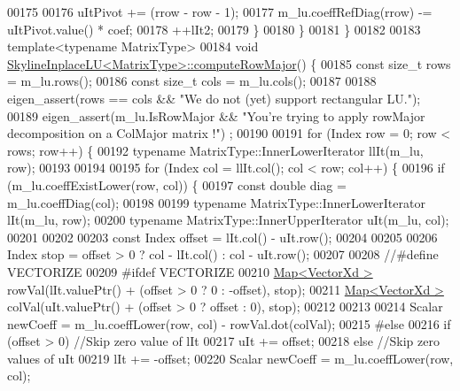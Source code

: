 \begin{DoxyCode}
00175 
00176             uItPivot += (rrow - row - 1);
00177             m\_lu.coeffRefDiag(rrow) -= uItPivot.value() * coef;
00178             ++lIt2;
00179         \}
00180     \}
00181 \}
00182 
00183 \textcolor{keyword}{template}<\textcolor{keyword}{typename} MatrixType>
00184 \textcolor{keywordtype}{void} \hyperlink{class_eigen_1_1_skyline_inplace_l_u}{SkylineInplaceLU<MatrixType>::computeRowMajor}() \{
00185     \textcolor{keyword}{const} \textcolor{keywordtype}{size\_t} rows = m\_lu.rows();
00186     \textcolor{keyword}{const} \textcolor{keywordtype}{size\_t} cols = m\_lu.cols();
00187 
00188     eigen\_assert(rows == cols && \textcolor{stringliteral}{"We do not (yet) support rectangular LU."});
00189     eigen\_assert(m\_lu.IsRowMajor && \textcolor{stringliteral}{"You're trying to apply rowMajor decomposition on a ColMajor matrix !"})
      ;
00190 
00191     \textcolor{keywordflow}{for} (Index row = 0; row < rows; row++) \{
00192         \textcolor{keyword}{typename} MatrixType::InnerLowerIterator llIt(m\_lu, row);
00193 
00194 
00195         \textcolor{keywordflow}{for} (Index col = llIt.col(); col < row; col++) \{
00196             \textcolor{keywordflow}{if} (m\_lu.coeffExistLower(row, col)) \{
00197                 \textcolor{keyword}{const} \textcolor{keywordtype}{double} diag = m\_lu.coeffDiag(col);
00198 
00199                 \textcolor{keyword}{typename} MatrixType::InnerLowerIterator lIt(m\_lu, row);
00200                 \textcolor{keyword}{typename} MatrixType::InnerUpperIterator uIt(m\_lu, col);
00201 
00202 
00203                 \textcolor{keyword}{const} Index offset = lIt.col() - uIt.row();
00204 
00205 
00206                 Index stop = offset > 0 ? col - lIt.col() : col - uIt.row();
00207 
00208                 \textcolor{comment}{//#define VECTORIZE}
00209 \textcolor{preprocessor}{#ifdef VECTORIZE}
00210                 \hyperlink{group___core___module_class_eigen_1_1_map}{Map<VectorXd >} rowVal(lIt.valuePtr() + (offset > 0 ? 0 : -offset), stop);
00211                 \hyperlink{group___core___module_class_eigen_1_1_map}{Map<VectorXd >} colVal(uIt.valuePtr() + (offset > 0 ? offset : 0), stop);
00212 
00213 
00214                 Scalar newCoeff = m\_lu.coeffLower(row, col) - rowVal.dot(colVal);
00215 \textcolor{preprocessor}{#else}
00216                 \textcolor{keywordflow}{if} (offset > 0) \textcolor{comment}{//Skip zero value of lIt}
00217                     uIt += offset;
00218                 \textcolor{keywordflow}{else} \textcolor{comment}{//Skip zero values of uIt}
00219                     lIt += -offset;
00220                 Scalar newCoeff = m\_lu.coeffLower(row, col);

\end{DoxyCode}
